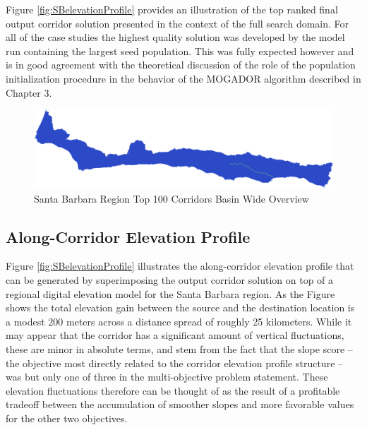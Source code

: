 Figure \ref{fig:SBelevationProfile} provides an illustration of the top ranked final output corridor solution presented in the context of the full search domain. For all of the case studies the highest quality solution was developed by the model run containing the largest seed population. This was fully expected however and is in good agreement with the theoretical discussion of the role of the population initialization procedure in the behavior of the MOGADOR algorithm described in Chapter 3.

        \begin{figure}[!h]
            \begin{center}
            \includegraphics[width=5.5in]{figures/SantaBarbara_PathwayLarge.png}   
            \caption{Santa Barbara Region Top 100 Corridors Basin Wide Overview}
            \label{fig:SBsolutionOverview}
            \end{center}
        \end{figure}
        
    \subsection{Along-Corridor Elevation Profile}
    
Figure \ref{fig:SBelevationProfile} illustrates the along-corridor elevation profile that can be generated by superimposing the output corridor solution on top of a regional digital elevation model for the Santa Barbara region. As the Figure shows the total elevation gain between the source and the destination location is a modest 200 meters across a distance spread of roughly 25 kilometers. While it may appear that the corridor has a significant amount of vertical fluctuations, these are minor in absolute terms, and stem from the fact that the slope score -- the objective most directly related to the corridor elevation profile structure -- was but only one of three in the multi-objective problem statement. These elevation fluctuations therefore can be thought of as the result of a profitable tradeoff between the accumulation of smoother slopes and more favorable values for the other two objectives. 
        
